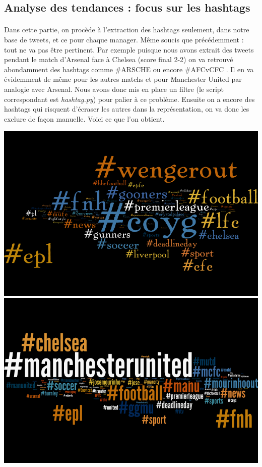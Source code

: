 \documentclass[14pt, openany]{article}
\begin{document}
\subsection{Analyse des tendances : focus sur les hashtags}
\paragraph{}
Dans cette partie, on procède à l'extraction des hashtags seulement, dans notre base de tweets, et ce pour chaque manager. Même soucis que précédemment : tout ne va pas être pertinent. Par exemple puisque nous avons extrait des tweets pendant le match d'Arsenal face à Chelsea (score final 2-2) on va retrouvé abondamment des hashtags comme \og \#ARSCHE \fg{} ou encore \og \#AFCvCFC \fg{}. Il en va évidemment de même pour les autres matchs et pour Manchester United par analogie avec Arsenal. Nous avons donc mis en place un filtre (le script correspondant est \textit{hashtag.py}) pour palier à ce problème. Ensuite on a encore des hashtags qui risquent d'écraser les autres dans la représentation, on va donc les exclure de façon manuelle. Voici ce que l'on obtient.
\begin{center}
\includegraphics[scale=0.55]{Images/wenger_hash.png}
\includegraphics[scale=0.55]{Images/mourinho_hash.png}
\end{center} 
\end{document}
